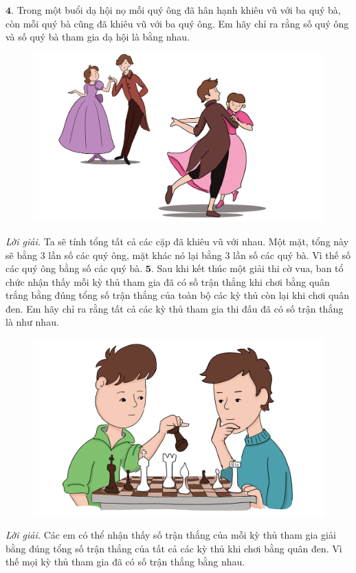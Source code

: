 \begin{multicols}{2}
	\vskip 0.1cm
	$\pmb{4.}$ Trong một buổi dạ hội nọ mỗi quý ông đã hân hạnh khiêu vũ với ba quý bà, còn mỗi quý bà cũng đã khiêu vũ với ba quý ông. Em hãy chỉ ra rằng số quý ông và số quý bà tham gia dạ hội là bằng nhau.
	\begin{figure}[H]
		\centering
		\vspace*{-5pt}
		\captionsetup{labelformat= empty, justification=centering}
		\includegraphics[width=0.85\linewidth]{Pi1_2_Bai4}
		\vspace*{-10pt}
	\end{figure}
	\textit{Lời giải.} Ta sẽ tính tổng tất cả các cặp đã khiêu vũ với nhau. Một mặt, tổng này sẽ bằng $3$ lần số các quý ông, mặt khác nó lại bằng $3$ lần số các quý bà. Vì thế số các quý ông bằng số các quý bà.
	\vskip 0.1cm
	$\pmb{5.}$ 	Sau khi kết thúc một giải thi cờ vua, ban tổ chức nhận thấy mỗi kỳ thủ tham gia đã có số trận thắng khi chơi bằng quân trắng bằng đúng tổng số trận thắng của toàn bộ các kỳ thủ còn lại khi chơi quân đen. Em hãy chỉ ra rằng tất cả các kỳ thủ tham gia thi đấu đã có số trận thắng là như nhau.
	\begin{figure}[H]
		\centering
		\vspace*{-5pt}
		\captionsetup{labelformat= empty, justification=centering}
		\includegraphics[width=0.6\linewidth]{Pi1_2_Bai5}
		\vspace*{-10pt}
	\end{figure}
	\textit{Lời giải.} Các em có thể nhận thấy số trận thắng của mỗi kỳ thủ tham gia giải bằng đúng tổng số trận thắng của tất cả các kỳ thủ khi chơi bằng quân đen. Vì thế mọi kỳ thủ tham gia đã có số trận thắng bằng nhau.

\end{multicols}
